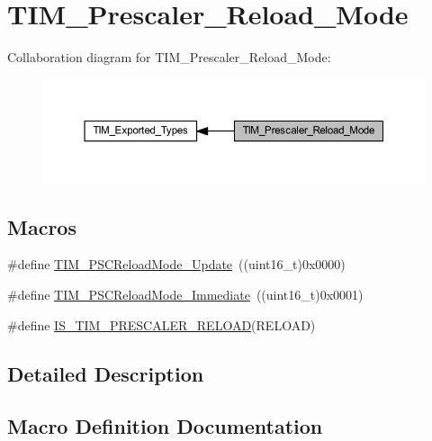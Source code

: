 \hypertarget{group___t_i_m___prescaler___reload___mode}{}\section{T\+I\+M\+\_\+\+Prescaler\+\_\+\+Reload\+\_\+\+Mode}
\label{group___t_i_m___prescaler___reload___mode}
Collaboration diagram for T\+I\+M\+\_\+\+Prescaler\+\_\+\+Reload\+\_\+\+Mode\+:
\nopagebreak
\begin{figure}[H]
\begin{center}
\leavevmode
\includegraphics[width=350pt]{group___t_i_m___prescaler___reload___mode}
\end{center}
\end{figure}
\subsection*{Macros}
\begin{DoxyCompactItemize}
\item 
\#define \hyperlink{group___t_i_m___prescaler___reload___mode_gad76dd05a3ae4e44e040e0e083bd460bf}{T\+I\+M\+\_\+\+P\+S\+C\+Reload\+Mode\+\_\+\+Update}~((uint16\+\_\+t)0x0000)
\item 
\#define \hyperlink{group___t_i_m___prescaler___reload___mode_ga9ba55481ccdcb64268b7b9f2095bfc17}{T\+I\+M\+\_\+\+P\+S\+C\+Reload\+Mode\+\_\+\+Immediate}~((uint16\+\_\+t)0x0001)
\item 
\#define \hyperlink{group___t_i_m___prescaler___reload___mode_ga156317fc6b2c1f6f2e1da9dfa555ecf4}{I\+S\+\_\+\+T\+I\+M\+\_\+\+P\+R\+E\+S\+C\+A\+L\+E\+R\+\_\+\+R\+E\+L\+O\+AD}(R\+E\+L\+O\+AD)
\end{DoxyCompactItemize}


\subsection{Detailed Description}


\subsection{Macro Definition Documentation}
\mbox{\label{group___t_i_m___prescaler___reload___mode_ga156317fc6b2c1f6f2e1da9dfa555ecf4}} 

